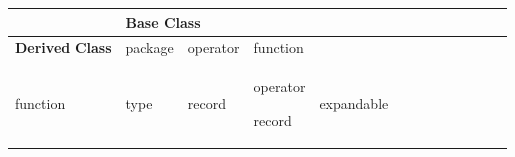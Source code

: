 \documentclass[10pt,a4paper]{report}
\begin{document}
{\tiny
\begin{longtable}[]{|l|l|l|l|l|l|l|l|l|l|l|l|l|}
\hline& \multicolumn{12}{l|}{\textbf{Base} \textbf{Class}}\\ \hline
\begin{minipage}[t]{0.05\columnwidth}\raggedright
\textbf{Derived}
\textbf{Class}\strut
\end{minipage} & \begin{minipage}[t]{0.05\columnwidth}\raggedright
package\strut
\end{minipage} & \begin{minipage}[t]{0.05\columnwidth}\raggedright
operator\strut
\end{minipage} & \begin{minipage}[t]{0.05\columnwidth}\raggedright
function\strut
\end{minipage} & \begin{minipage}[t]{0.05\columnwidth}\raggedright
operator\\
function\strut
\end{minipage} & \begin{minipage}[t]{0.05\columnwidth}\raggedright
type\strut
\end{minipage} & \begin{minipage}[t]{0.05\columnwidth}\raggedright
record\strut
\end{minipage} & \begin{minipage}[t]{0.05\columnwidth}\raggedright
operator

record\strut
\end{minipage} & \begin{minipage}[t]{0.05\columnwidth}\raggedright
expandable


\end{minipage}
\end{longtable}}
\end{document}
